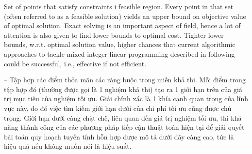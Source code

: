\documentclass{article}
\begin{document}
\begin{itemize}
\begin{itemize}
        Set of points that satisfy constraints i feasible region. Every point in that set (often referred to as a feasible solution) yields an upper bound on objective value of optimal solution. Exact solving is an important aspect of field, hence a lot of attention is also given to find lower bounds to optimal cost. Tighter lower bounds, w.r.t. optimal solution value, higher chances that current algorithmic approaches to tackle mixed-integer linear programming described in following could be successful, i.e., effective if not efficient.

        -- Tập hợp các điểm thỏa mãn các ràng buộc trong miền khả thi. Mỗi điểm trong tập hợp đó (thường được gọi là 1 nghiệm khả thi) tạo ra 1 giới hạn trên của giá trị mục tiêu của nghiệm tối ưu. Giải chính xác là 1 khía cạnh quan trọng của lĩnh vực này, do đó việc tìm kiếm giới hạn dưới của chi phí tối ưu cũng được chú trọng. Giới hạn dưới càng chặt chẽ, liên quan đến giá trị nghiệm tối ưu, thì khả năng thành công của các phương pháp tiếp cận thuật toán hiện tại để giải quyết bài toán quy hoạch tuyến tính hỗn hợp được mô tả dưới đây càng cao, tức là hiệu quả nếu không muốn nói là hiệu suất.


\end{itemize}
\end{itemize}
\end{document}
